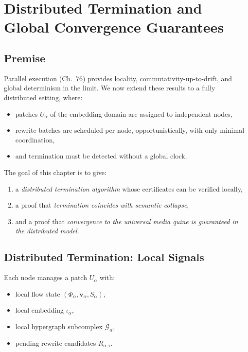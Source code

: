 \chapter{Distributed Termination and Global Convergence Guarantees}
\label{ch:77}

\section{Premise}

Parallel execution (Ch.~76) provides locality, commutativity-up-to-drift,
and global determinism in the limit.  
We now extend these results to a fully distributed setting, where:

\begin{itemize}
\item patches $U_\alpha$ of the embedding domain  
      are assigned to independent nodes,
\item rewrite batches are scheduled per-node, opportunistically,  
      with only minimal coordination,
\item and termination must be detected without a global clock.
\end{itemize}

\noindent
The goal of this chapter is to give:

\begin{enumerate}
\item a \emph{distributed termination algorithm} whose certificates can be  
      verified locally,
\item a proof that \emph{termination coincides with semantic collapse},
\item and a proof that \emph{convergence to the universal media quine  
      is guaranteed in the distributed model}.
\end{enumerate}

\section{Distributed Termination: Local Signals}

Each node manages a patch $U_\alpha$ with:

\begin{itemize}
\item local flow state $(\Phi_\alpha,\mathbf{v}_\alpha,S_\alpha)$,
\item local embedding $\iota_\alpha$,
\item local hypergraph subcomplex $\mathcal{G}_\alpha$,
\item pending rewrite candidates $R_{\alpha,i}$.
\end{itemize}

